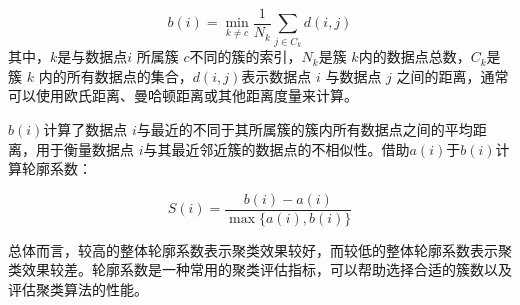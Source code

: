 \documentclass[UTF8,12pt]{ctexart}
\begin{document}
	\begin{equation}
		b(i) = \min_{k \neq c} \dfrac{1}{N_k} \sum_{j \in C_k} d(i, j) 
	\end{equation}
	其中，$k$是与数据点$i$ 所属簇 $c$不同的簇的索引，$N_k$是簇 $k$内的数据点总数，$C_k$是簇 $k$ 内的所有数据点的集合，$d(i, j)$表示数据点 $i$ 与数据点 $j$ 之间的距离，通常可以使用欧氏距离、曼哈顿距离或其他距离度量来计算。
	
	$b(i)$计算了数据点 $i$与最近的不同于其所属簇的簇内所有数据点之间的平均距离，用于衡量数据点 $i$与其最近邻近簇的数据点的不相似性。借助$a(i)$于$b(i)$计算轮廓系数：
	
	\begin{equation}
		S(i) = \frac{b(i) - a(i)}{\max\{a(i), b(i)\}}
	\end{equation}

	
	总体而言，较高的整体轮廓系数表示聚类效果较好，而较低的整体轮廓系数表示聚类效果较差。轮廓系数是一种常用的聚类评估指标，可以帮助选择合适的簇数以及评估聚类算法的性能。
\end{document}
